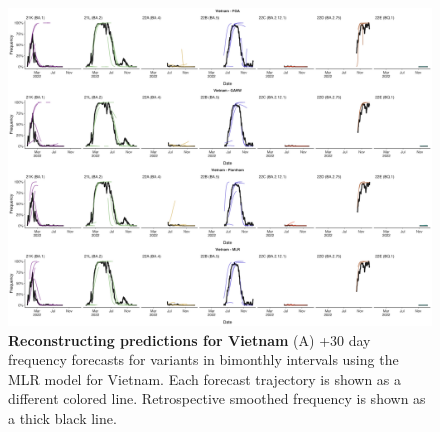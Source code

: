 \begin{figure}[th!]
	\centering
	\includegraphics[width=0.9\textwidth=0.01]{supp_figures/supplementary_fig_Vietnam.png}
	\caption[\textbf{Reconstructing predictions for Vietnam}]{
		\textbf{Reconstructing predictions for Vietnam}
		(A) +30 day frequency forecasts for variants in bimonthly intervals using the MLR model for Vietnam.
		Each forecast trajectory is shown as a different colored line.
		Retrospective smoothed frequency is shown as a thick black line.
	}
	\label{fig:S7}
\end{figure}


